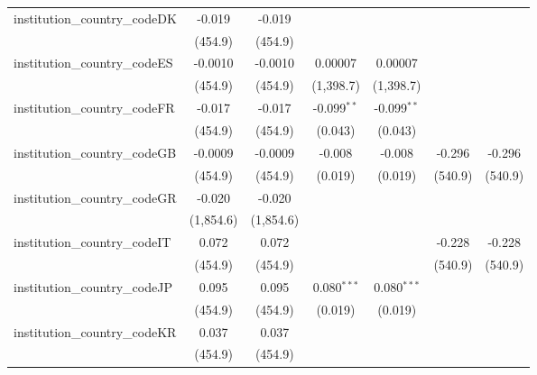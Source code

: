\begin{tabular}{lcccccc}
   institution\_country\_codeDK          & -0.019        & -0.019        &                &                &           &   \\   
                                         & (454.9)       & (454.9)       &                &                &           &   \\   
   institution\_country\_codeES          & -0.0010       & -0.0010       & 0.00007        & 0.00007        &           &   \\   
                                         & (454.9)       & (454.9)       & (1,398.7)      & (1,398.7)      &           &   \\   
   institution\_country\_codeFR          & -0.017        & -0.017        & -0.099$^{**}$  & -0.099$^{**}$  &           &   \\   
                                         & (454.9)       & (454.9)       & (0.043)        & (0.043)        &           &   \\   
   institution\_country\_codeGB          & -0.0009       & -0.0009       & -0.008         & -0.008         & -0.296    & -0.296\\   
                                         & (454.9)       & (454.9)       & (0.019)        & (0.019)        & (540.9)   & (540.9)\\   
   institution\_country\_codeGR          & -0.020        & -0.020        &                &                &           &   \\   
                                         & (1,854.6)     & (1,854.6)     &                &                &           &   \\   
   institution\_country\_codeIT          & 0.072         & 0.072         &                &                & -0.228    & -0.228\\   
                                         & (454.9)       & (454.9)       &                &                & (540.9)   & (540.9)\\   
   institution\_country\_codeJP          & 0.095         & 0.095         & 0.080$^{***}$  & 0.080$^{***}$  &           &   \\   
                                         & (454.9)       & (454.9)       & (0.019)        & (0.019)        &           &   \\   
   institution\_country\_codeKR          & 0.037         & 0.037         &                &                &           &   \\   
                                         & (454.9)       & (454.9)       &                &                &           &   \\   

\end{tabular}
